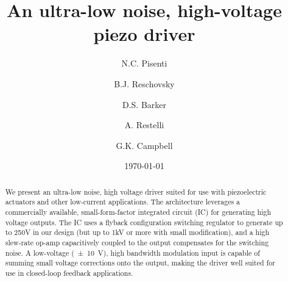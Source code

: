 \documentclass[aip,rsi,preprint,graphicx]{revtex4-1} %
\begin{document}

\title{An ultra-low noise, high-voltage piezo driver}



\author{N.C. Pisenti}
\author{B.J. Reschovsky}
\author{D.S. Barker}
\author{A. Restelli}
\author{G.K. Campbell}


\date{\today}

\begin{abstract}
We present an ultra-low noise, high voltage driver suited for use with piezoelectric actuators and other low-current applications.
The architecture leverages a commercially available, small-form-factor integrated circuit (IC) for generating high voltage outputs.
The IC uses a flyback configuration switching regulator to generate up to 250V in our design (but up to 1kV or more with small modification), and a high slew-rate op-amp capacitively coupled to the output compensates for the switching noise.
A low-voltage (\SI{\pm 10}{\volt}), high bandwidth modulation input is capable of summing small voltage corrections onto the output, making the driver well suited for use in closed-loop feedback applications.
\end{abstract}

\pacs{}%

\maketitle %
\end{document}
